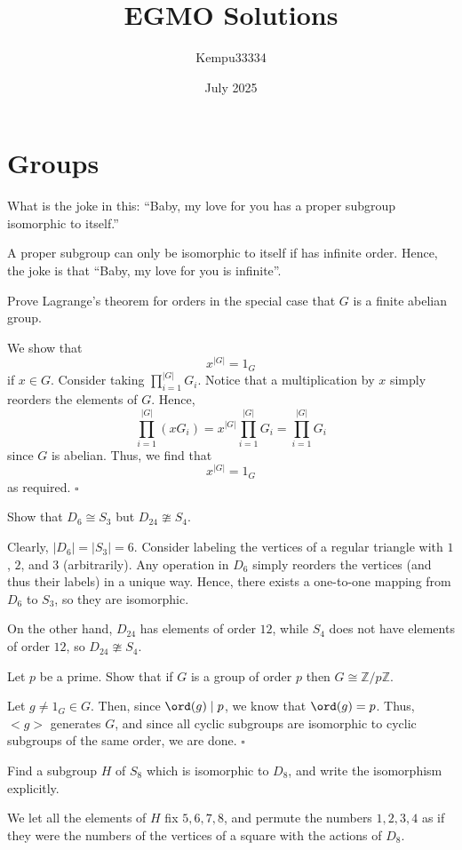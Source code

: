 \documentclass{article}
\title{EGMO Solutions}
\author{Kempu33334}
\date{July 2025}
\begin{document}
\maketitle

\tableofcontents

\newpage

\section{Groups}

\begin{problem}[1.A]
What is the joke in this: ``Baby, my love for you has a proper subgroup isomorphic to itself.''
\end{problem}
A proper subgroup can only be isomorphic to itself if has infinite order. Hence, the joke is that ``Baby, my love for you is infinite''.

\begin{problem}[1.B]
Prove Lagrange's theorem for orders in the special case that $G$ is a finite abelian group.
\end{problem}
We show that \[x^{|G|} = 1_G\] if $x \in G$. Consider taking $\prod_{i=1}^{|G|}G_i$. Notice that a multiplication by $x$ simply reorders the elements of $G$. Hence, \[\prod_{i=1}^{|G|}(xG_i) = x^{|G|}\prod_{i=1}^{|G|}G_i = \prod_{i=1}^{|G|}G_i\] since $G$ is abelian. Thus, we find that \[x^{|G|} = 1_G\] as required. $\square$

\begin{problem}[1.C]
Show that $D_6 \cong S_3$ but $D_{24} \ncong S_4$.
\end{problem}
Clearly, $|D_6| = |S_3| = 6$. Consider labeling the vertices of a regular triangle with $1$, $2$, and $3$ (arbitrarily). Any operation in $D_6$ simply reorders the vertices (and thus their labels) in a unique way. Hence, there exists a one-to-one mapping from $D_6$ to $S_3$, so they are isomorphic.

On the other hand, $D_{24}$ has elements of order $12$, while $S_4$ does not have elements of order $12$, so $D_{24} \ncong S_4$.

\begin{problem}[1.D]
Let $p$ be a prime. Show that if $G$ is a group of order $p$ then $G \cong \mathbb{Z}/p\mathbb{Z}$.
\end{problem}
Let $g \neq 1_G \in G$. Then, since $\ord(g) \mid p$, we know that $\ord(g) = p$. Thus, $<g>$ generates $G$, and since all cyclic subgroups are isomorphic to cyclic subgroups of the same order, we are done. $\square$

\begin{problem}[1.E]
Find a subgroup $H$ of $S_8$ which is isomorphic to $D_8$, and write the isomorphism explicitly.
\end{problem}
We let all the elements of $H$ fix $5, 6, 7, 8$, and permute the numbers $1, 2, 3, 4$ as if they were the numbers of the vertices of a square with the actions of $D_8$.
\end{document}

